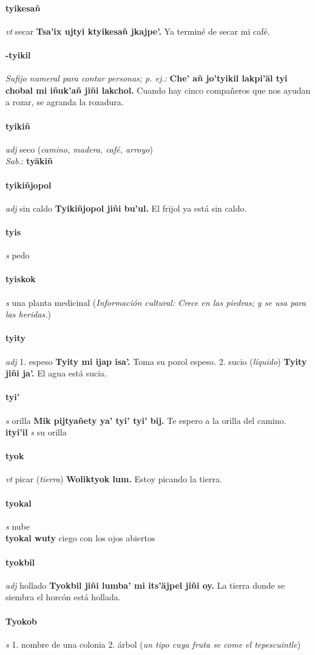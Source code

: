 \documentclass{scrbook}
\newcommand{\entry}[1]{\paragraph{#1}}
\newcommand{\onedefinition}[1]{#1.}
\newcommand{\nontranslationdef}[1]{\textit{#1}}
\newcommand{\partofspeech}[1]{\textit{#1}}
\newcommand{\spanishtranslation}[1]{#1}
\newcommand{\clarification}[1]{(\textit{#1})}
\newcommand{\cholexample}[1]{\textbf{#1}}
\newcommand{\exampletranslation}[1]{#1}
\newcommand{\dialectvariant}[1]{\\\textit{#1}:}
\newcommand{\dialectword}[1]{\textbf{#1}}
\newcommand{\culturalinformation}[1]{(\textit{#1})}
\newcommand{\secondaryentry}[1]{\\\textbf{#1}}
\newcommand{\secondpartofspeech}[1]{\textit{#1}}
\newcommand{\secondtranslation}[1]{#1}
\begin{document}
\begin{multicols}{2}
\entry{tyikesañ}
\partofspeech{vt}
\spanishtranslation{secar}
\cholexample{Tsa'ix ujtyi ktyikesañ jkajpe'.}
\exampletranslation{Ya terminé de secar mi café.}

\entry{-tyikil}
\nontranslationdef{Sufijo numeral para contar personas; p. ej.:}
\cholexample{Che' añ jo'tyikil lakpi'äl tyi chobal mi iñuk'añ jiñi lakchol.}
\exampletranslation{Cuando hay cinco compañeros que nos ayudan a rozar, se agranda la rozadura.}

\entry{tyikiñ}
\partofspeech{adj}
\spanishtranslation{seco}
\clarification{camino, madera, café, arroyo}
\dialectvariant{Sab.}
\dialectword{tyäkiñ}

\entry{tyikiñjopol}
\partofspeech{adj}
\spanishtranslation{sin caldo}
\cholexample{Tyikiñjopol jiñi bu'ul.}
\exampletranslation{El frijol ya está sin caldo.}

\entry{tyis}
\partofspeech{s}
\spanishtranslation{pedo}

\entry{tyiskok}
\partofspeech{s}
\spanishtranslation{una planta medicinal}
\culturalinformation{Información cultural: Crece en las piedras; y se usa para las heridas.}

\entry{tyity}
\partofspeech{adj}
\onedefinition{1}
\spanishtranslation{espeso}
\cholexample{Tyity mi ijap isa'.}
\exampletranslation{Toma su pozol espeso.}
\onedefinition{2}
\spanishtranslation{sucio}
\clarification{líquido}
\cholexample{Tyity jiñi ja'.}
\exampletranslation{El agua está sucia.}

\entry{tyi'}
\partofspeech{s}
\spanishtranslation{orilla}
\cholexample{Mik pijtyañety ya' tyi' tyi' bij.}
\exampletranslation{Te espero a la orilla del camino.}
\secondaryentry{ityi'il}
\secondpartofspeech{s}
\secondtranslation{su orilla}

\entry{tyok}
\partofspeech{vt}
\spanishtranslation{picar}
\clarification{tierra}
\cholexample{Woliktyok lum.}
\exampletranslation{Estoy picando la tierra.}

\entry{tyokal}
\partofspeech{s}
\spanishtranslation{nube}
\secondaryentry{tyokal wuty}
\secondtranslation{ciego con los ojos abiertos}

\entry{tyokbil}
\partofspeech{adj}
\spanishtranslation{hollado}
\cholexample{Tyokbil jiñi lumba' mi its'äjpel jiñi oy.}
\exampletranslation{La tierra donde se siembra el horcón está hollada.}

\entry{Tyokob}
\partofspeech{s}
\onedefinition{1}
\spanishtranslation{nombre de una colonia}
\onedefinition{2}
\spanishtranslation{árbol}
\clarification{un tipo cuya fruta se come el tepescuintle}


\end{multicols}
\end{document}
